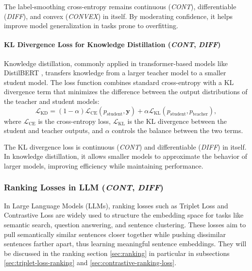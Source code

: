 \documentclass[sn-mathphys-num]{sn-jnl}%
\newcommand \cont{\textit{CONT}}
\newcommand \diff{\textit{DIFF}}
\newcommand \conv{\textit{CONVEX}}
\renewcommand\vec{\mathbf}
\begin{document}
The label-smoothing cross-entropy remains continuous (\cont), differentiable (\diff), and convex (\conv) in itself. By moderating confidence, it helps improve model generalization in tasks prone to overfitting.

\paragraph{KL Divergence Loss for Knowledge Distillation (\cont, \diff)}\label{subsubsec-transformer_kl_distillation_loss}
Knowledge distillation, commonly applied in transformer-based models like DistilBERT \cite{sanh2019distilbert}, transfers knowledge from a larger teacher model to a smaller student model. The loss function combines standard cross-entropy with a KL divergence term that minimizes the difference between the output distributions of the teacher and student models:
\begin{equation}
    \mathcal{L}_{\text{KD}} = (1 - \alpha) \mathcal{L}_{\text{CE}}(p_{\text{student}}, \vec{y}) + \alpha \mathcal{L}_{\text{KL}}(p_{\text{student}}, p_{\text{teacher}}),
\end{equation}
where \( \mathcal{L}_{\text{CE}} \) is the cross-entropy loss, \( \mathcal{L}_{\text{KL}} \) is the KL divergence between the student and teacher outputs, and \( \alpha \) controls the balance between the two terms.

The KL divergence loss is continuous (\cont) and differentiable (\diff) in itself. In knowledge distillation, it allows smaller models to approximate the behavior of larger models, improving efficiency while maintaining performance.


\subsubsection{Ranking Losses in LLM (\cont, \diff)}\label{subsubsec-transformer_ranking_losses}
In Large Language Models (LLMs), ranking losses such as Triplet Loss and Contrastive Loss are widely used to structure the embedding space for tasks like semantic search, question answering, and sentence clustering. These losses aim to pull semantically similar sentences closer together while pushing dissimilar sentences farther apart, thus learning meaningful sentence embeddings. They will be discussed in the ranking section \ref{sec:ranking} in particular in subsections \ref{sec:triplet-loss-ranking} and \ref{sec:contrastive-ranking-loss}.

\end{document}
